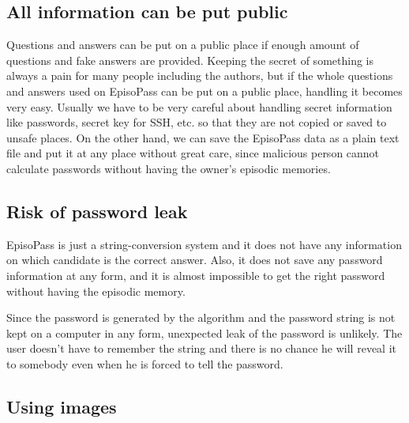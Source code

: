 \documentclass{article}
\begin{document}
\subsection{All information can be put public}

Questions and answers can be put on a public place
if enough amount of questions and fake answers are provided.
%
Keeping the secret of something is always a pain for many people including
the authors, but if the whole questions and answers used on EpisoPass
can be put on a public place,
handling it becomes very easy.
Usually we have to be very careful about handling
secret information like passwords, secret key for SSH, etc.
so that they are not copied or saved to unsafe places.
On the other hand,
we can save the EpisoPass data as a plain text file and put it at
any place without great care, since malicious person cannot calculate
passwords without having the owner's episodic memories.


\subsection{Risk of password leak}

EpisoPass is just a string-conversion system and it does not
have any information on which candidate is the correct answer.
Also, it does not save any password information at any form, and
it is almost impossible to get the right password 
without having the episodic memory.


Since the password is generated by the algorithm and the password
string is not kept on a computer in any form,
unexpected leak of the password is unlikely.
The user doesn't have to remember the string and
there is no chance he will reveal it to somebody
even when he is forced to tell the password.



\subsection{Using images}
\end{document}
